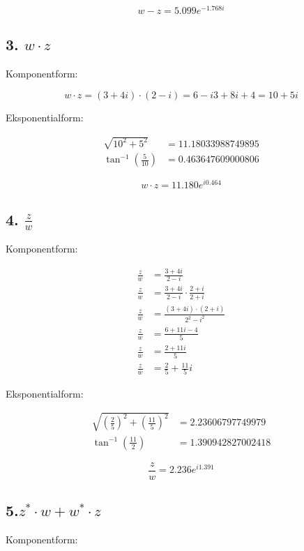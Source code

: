 \documentclass[a4paper, 12pt]{article}
\begin{document}
$$w-z = 5.099 e^{-1.768 i}$$


\subsection*{3. \(w \cdot z\)}
\label{sec:orgc61ce03}

Komponentform:

$$w \cdot z = (3+4i) \cdot (2-i) = 6 -i3 +8i +4 = 10+5i$$

Eksponentialform:

\begin{align*}
\sqrt{10^2+5^2} &= 11.18033988749895 \\
\tan^{-1} \left( \frac{5}{10} \right) &=0.463647609000806
\end{align*}

$$w \cdot z = 11.180 e^{i0.464}$$

\subsection*{4. \(\frac{z}{w}\)}
\label{sec:orgdccb847}

Komponentform:

\begin{align*}
    \frac{z}{w} &= \frac{3+4i}{2-i} \\
    \frac{z}{w} &= \frac{3+4i}{2-i}\cdot \frac{2+i}{2 + i} \\ 
    \frac{z}{w} &= \frac{(3+4i)\cdot(2+i)}{2^2-i^2} \\
    \frac{z}{w} &= \frac{6+11i -4}{5}  \\
    \frac{z}{w} &= \frac{2+11i }{5}  \\
    \frac{z}{w} &= \frac{2}{5}+\frac{11}{5}i   
\end{align*}

Eksponentialform:

\begin{align*}
\sqrt{\left(\frac{2}{5}\right)^2+\left(\frac{11}{5}\right)^2} &=2.23606797749979 \\
\tan^{-1} \left( \frac{11}{2} \right) &= 1.390942827002418
\end{align*}

$$\frac{z}{w} = 2.236 e^{i 1.391}$$

\subsection*{5.\(z^* \cdot w + w^*\cdot z\)}
\label{sec:org8ee4cd0}

Komponentform:
\end{document}
